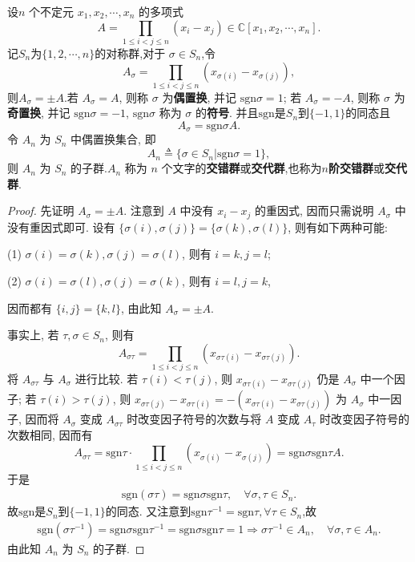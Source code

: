 \documentclass[../../main.tex]{subfiles}%
\begin{document}
\begin{theorem}\label{theorem:奇置换与偶置换}
设\( n \) 个不定元 \( x_1, x_2, \cdots, x_n \) 的多项式
\[
A = \prod_{1 \leqslant i < j \leqslant n} (x_i - x_j) \in \mathbb{C}[x_1, x_2, \cdots, x_n].
\]
记$S_n$为$\{1,2,\cdots,n\}$的对称群,对于 \( \sigma \in S_n \),令
\[
A_\sigma = \prod_{1 \leqslant i < j \leqslant n} (x_{\sigma(i)} - x_{\sigma(j)}),
\]
则$A_{\sigma}=\pm A$.若 \( A_\sigma = A \), 则称 \( \sigma \) 为\textbf{偶置换}, 并记 \( \text{sgn}\sigma = 1 \); 若 \( A_\sigma = -A \), 则称 \( \sigma \) 为\textbf{奇置换}, 并记 \( \text{sgn}\sigma = -1 \), \( \text{sgn}\sigma \) 称为 \( \sigma \) 的\textbf{符号}. 并且$\text{sgn}$是$S_n$到$\{-1,1\}$的同态且
\[
A_\sigma = \text{sgn}\sigma A.
\]
令 \( A_n \) 为 \( S_n \) 中偶置换集合, 即
\[
A_n \triangleq \{\sigma \in S_n|\text{sgn}\sigma = 1\},
\]
则 \( A_n \) 为 \( S_n \) 的子群.\( A_n \) 称为 \( n \) 个文字的\textbf{交错群}或\textbf{交代群},也称为\textbf{$n$阶交错群}或\textbf{交代群}.
\end{theorem}
\begin{proof}

先证明 \( A_\sigma = \pm A \). 注意到 \( A \) 中没有 \( x_i - x_j \) 的重因式, 因而只需说明 \( A_\sigma \) 中没有重因式即可. 设有 \( \{\sigma(i), \sigma(j)\} = \{\sigma(k), \sigma(l)\} \), 则有如下两种可能:

(1) \( \sigma(i) = \sigma(k), \sigma(j) = \sigma(l) \), 则有 \( i = k, j = l \);

(2) \( \sigma(i) = \sigma(l), \sigma(j) = \sigma(k) \), 则有 \( i = l, j = k \),

因而都有 \( \{i, j\} = \{k, l\} \), 由此知 \( A_\sigma = \pm A \).

事实上, 若 \( \tau, \sigma \in S_n \), 则有
\[
A_{\sigma\tau} = \prod_{1 \leqslant i < j \leqslant n} (x_{\sigma\tau(i)} - x_{\sigma\tau(j)}).
\]
将 \( A_{\sigma\tau} \) 与 \( A_\sigma \) 进行比较. 若 \( \tau(i) < \tau(j) \), 则 \( x_{\sigma\tau(i)} - x_{\sigma\tau(j)} \) 仍是 \( A_\sigma \) 中一个因子; 若 \( \tau(i) > \tau(j) \), 则 \( x_{\sigma\tau(j)} - x_{\sigma\tau(i)} = -(x_{\sigma\tau(i)} - x_{\sigma\tau(j)}) \) 为 \( A_\sigma \) 中一因子, 因而将 \( A_\sigma \) 变成 \( A_{\sigma\tau} \) 时改变因子符号的次数与将 \( A \) 变成 \( A_\tau \) 时改变因子符号的次数相同, 因而有
\[
A_{\sigma\tau} = \text{sgn}\tau \cdot \prod_{1 \leqslant i < j \leqslant n} (x_{\sigma(i)} - x_{\sigma(j)}) = \text{sgn}\sigma\text{sgn}\tau A.
\]
于是
\begin{align*}
\text{sgn}(\sigma\tau) = \text{sgn}\sigma\text{sgn}\tau, \quad \forall \sigma, \tau \in S_n.
\end{align*}
故$\text{sgn}$是$S_n$到$\{-1,1\}$的同态.
又注意到$\text{sgn}\tau^{-1}=\text{sgn}\tau,  \forall \tau \in S_n$,故
\begin{align*}
\text{sgn}(\sigma\tau^{-1}) = \text{sgn}\sigma\text{sgn}\tau^{-1}=\text{sgn}\sigma\text{sgn}\tau=1\Longrightarrow \sigma\tau^{-1}\in A_n, \quad \forall \sigma, \tau \in A_n.
\end{align*}
由此知 \( A_n \) 为 \( S_n \) 的子群.

\end{proof}
\end{document}
